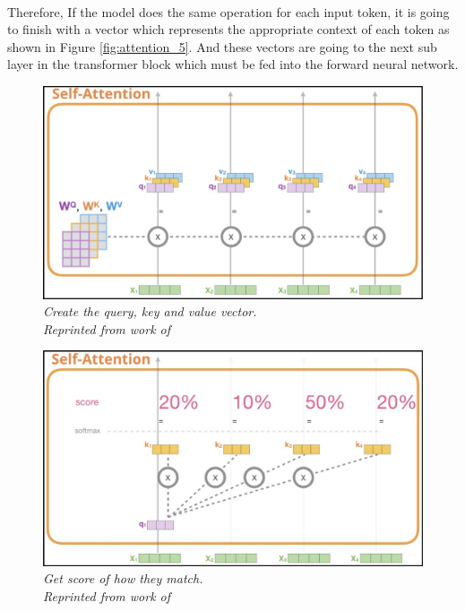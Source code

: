\paragraph{}
Therefore, If the model does the same operation for each input token, it is going to finish with a vector which represents the appropriate context of each token as shown in Figure \ref{fig:attention_5}. And these vectors are going to the next sub layer in the transformer block which must be fed into the forward neural network.
\begin{figure}[H]
  \centering
  \caption[Create the query, key and value vector.]{\emph{Create the query, key and value vector. \\ 
  Reprinted from work of \citeauthor{alammar_2018} \citeyear{alammar_2018}}}\label{fig:attention_2}
  \includegraphics[scale = 0.3]{figures/attention_2.jpg}  
\end{figure}

\begin{figure}[H]
  \centering
  \caption[Get score of how they match.]{\emph{Get score of how they match. \\ 
  Reprinted from work of \citeauthor{alammar_2018} \citeyear{alammar_2018}}}\label{fig:attention_3}
  \includegraphics[scale = 0.3]{figures/attention_3.jpg}  
\end{figure}

